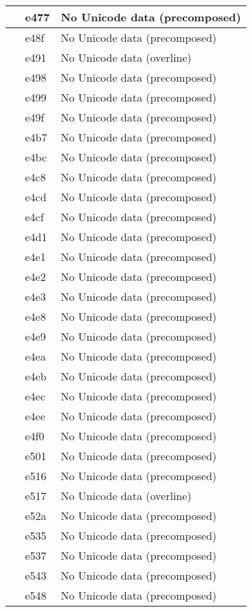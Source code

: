 \documentclass[12pt,letterpaper,openany]{book}
\begin{document}
\begin{center}
\begin{supertabular}{|m{0.25in}|m{0.5in}|m{4in}|}
 & e477 & No Unicode data (precomposed)\\\hline
 & e48f & No Unicode data (precomposed)\\\hline
 & e491 & No Unicode data (overline)\\\hline
 & e498 & No Unicode data (precomposed)\\\hline
 & e499 & No Unicode data (precomposed)\\\hline
 & e49f & No Unicode data (precomposed)\\\hline
 & e4b7 & No Unicode data (precomposed)\\\hline
 & e4bc & No Unicode data (precomposed)\\\hline
 & e4c8 & No Unicode data (precomposed)\\\hline
 & e4cd & No Unicode data (precomposed)\\\hline
 & e4cf & No Unicode data (precomposed)\\\hline
 & e4d1 & No Unicode data (precomposed)\\\hline
 & e4e1 & No Unicode data (precomposed)\\\hline
 & e4e2 & No Unicode data (precomposed)\\\hline
 & e4e3 & No Unicode data (precomposed)\\\hline
 & e4e8 & No Unicode data (precomposed)\\\hline
 & e4e9 & No Unicode data (precomposed)\\\hline
 & e4ea & No Unicode data (precomposed)\\\hline
 & e4eb & No Unicode data (precomposed)\\\hline
 & e4ec & No Unicode data (precomposed)\\\hline
 & e4ee & No Unicode data (precomposed)\\\hline
 & e4f0 & No Unicode data (precomposed)\\\hline
 & e501 & No Unicode data (precomposed)\\\hline
 & e516 & No Unicode data (precomposed)\\\hline
 & e517 & No Unicode data (overline)\\\hline
 & e52a & No Unicode data (precomposed)\\\hline
 & e535 & No Unicode data (precomposed)\\\hline
 & e537 & No Unicode data (precomposed)\\\hline
 & e543 & No Unicode data (precomposed)\\\hline
 & e548 & No Unicode data (precomposed)\\\hline

\end{supertabular}
\end{center}
\end{document}
